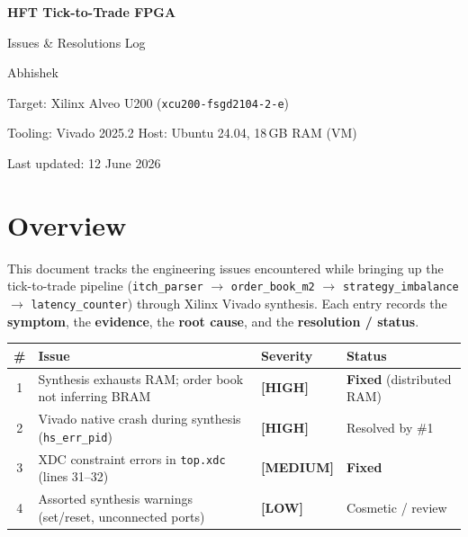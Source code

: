 \documentclass[11pt,a4paper]{article}
\newcommand{\sev}[1]{%
  \ifstrequal{#1}{HIGH}{\textcolor{sev-high}{\textbf{[HIGH]}}}{%
  \ifstrequal{#1}{MED}{\textcolor{sev-med}{\textbf{[MEDIUM]}}}{%
  \textcolor{sev-low}{\textbf{[LOW]}}}}}
\begin{document}
\begin{titlepage}
\centering
\vspace*{3cm}
{\Huge\bfseries HFT Tick-to-Trade FPGA\par}
\vspace{0.5cm}
{\LARGE Issues \& Resolutions Log\par}
\vspace{2cm}
{\large Abhishek\par}
\vspace{0.3cm}
{\large Target: Xilinx Alveo U200 (\texttt{xcu200-fsgd2104-2-e})\par}
{\large Tooling: Vivado 2025.2 \quad Host: Ubuntu 24.04, 18\,GB RAM (VM)\par}
\vfill
{\large Last updated: 12 June 2026\par}
\end{titlepage}

\tableofcontents
\newpage

\section{Overview}
This document tracks the engineering issues encountered while bringing up the
tick-to-trade pipeline (\texttt{itch\_parser} $\rightarrow$
\texttt{order\_book\_m2} $\rightarrow$ \texttt{strategy\_imbalance} $\rightarrow$
\texttt{latency\_counter}) through Xilinx Vivado synthesis. Each entry records
the \textbf{symptom}, the \textbf{evidence}, the \textbf{root cause}, and the
\textbf{resolution / status}.

\begin{center}
\begin{longtable}{@{}clll@{}}
\toprule
\textbf{\#} & \textbf{Issue} & \textbf{Severity} & \textbf{Status} \\
\midrule
\endhead
1 & Synthesis exhausts RAM; order book not inferring BRAM & \sev{HIGH}   & \textbf{Fixed} (distributed RAM) \\
2 & Vivado native crash during synthesis (\texttt{hs\_err\_pid}) & \sev{HIGH}   & Resolved by \#1 \\
3 & XDC constraint errors in \texttt{top.xdc} (lines 31--32)    & \sev{MED}    & \textbf{Fixed} \\
4 & Assorted synthesis warnings (set/reset, unconnected ports) & \sev{LOW}    & Cosmetic / review \\
\bottomrule
\end{longtable}
\end{center}
\end{document}
